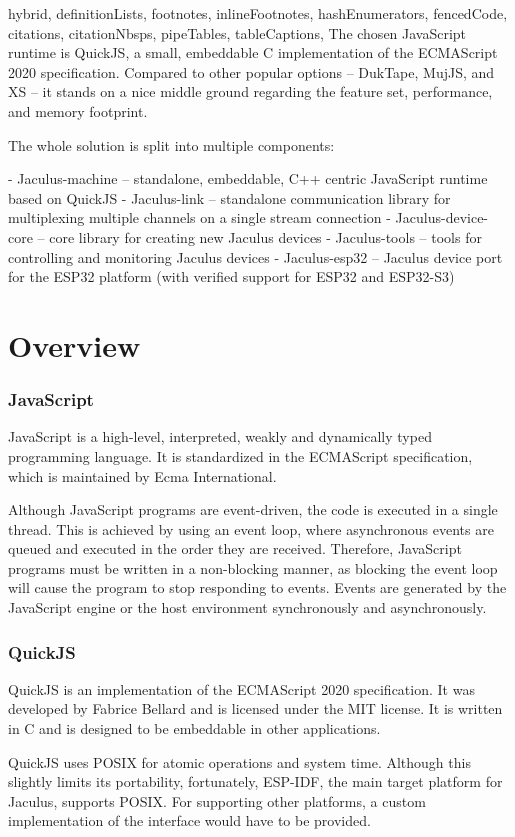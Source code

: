 \documentclass[
  digital,
  oneside,
  nosansbold,
  nocolorbold,
  lof,
  lot
]{fithesis4}
\begin{document}
\begin{markdown*}{%
  hybrid,
  definitionLists,
  footnotes,
  inlineFootnotes,
  hashEnumerators,
  fencedCode,
  citations,
  citationNbsps,
  pipeTables,
  tableCaptions,
}
The chosen JavaScript runtime is QuickJS, a small, embeddable C implementation of the ECMAScript 2020 specification. Compared to other popular options -- DukTape, MujJS, and XS -- it stands on a nice middle ground regarding the feature set, performance, and memory footprint.

The whole solution is split into multiple components:

  - Jaculus-machine -- standalone, embeddable, C++ centric JavaScript runtime based on QuickJS
  - Jaculus-link -- standalone communication library for multiplexing multiple channels on a single stream connection
  - Jaculus-device-core -- core library for creating new Jaculus devices
  - Jaculus-tools -- tools for controlling and monitoring Jaculus devices
  - Jaculus-esp32 -- Jaculus device port for the ESP32 platform (with verified support for ESP32 and ESP32-S3)


\chapter{Overview}

\subsection{JavaScript}

JavaScript is a high-level, interpreted, weakly and dynamically typed programming language. It is standardized in the ECMAScript specification, which is maintained by Ecma International.

Although JavaScript programs are event-driven, the code is executed in a single thread. This is achieved by using an event loop, where asynchronous events are queued and executed in the order they are received. Therefore, JavaScript programs must be written in a non-blocking manner, as blocking the event loop will cause the program to stop responding to events. Events are generated by the JavaScript engine or the host environment synchronously and asynchronously.


\subsection{QuickJS}

QuickJS is an implementation of the ECMAScript 2020 specification. It was developed by Fabrice Bellard and is licensed under the MIT license. It is written in C and is designed to be embeddable in other applications.

QuickJS uses POSIX for atomic operations and system time. Although this slightly limits its portability, fortunately, ESP-IDF, the main target platform for Jaculus, supports POSIX. For supporting other platforms, a custom implementation of the interface would have to be provided.


\end{markdown*}
\end{document}
